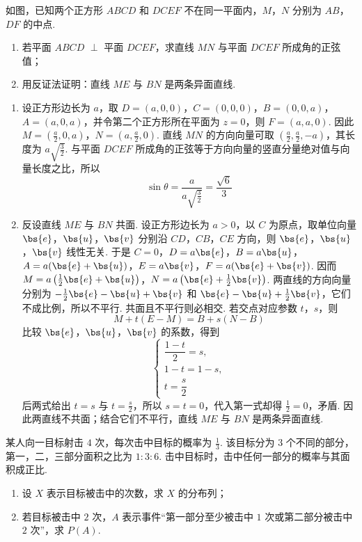 \begin{problem}
如图，已知两个正方形 \(ABCD\) 和 \(DCEF\) 不在同一平面内，\(M\)，\(N\) 分别为 \(AB\)，\(DF\) 的中点.
\begin{enumerate}
\item 若平面 \(ABCD\) \(\perp\) 平面 \(DCEF\)，求直线 \(MN\) 与平面 \(DCEF\) 所成角的正弦值；
\item 用反证法证明：直线 \(ME\) 与 \(BN\) 是两条异面直线.
\end{enumerate}

\end{problem}

\begin{solution}
\begin{enumerate}
\item 设正方形边长为 \(a\)，取 \(D=(a,0,0)\)，\(C=(0,0,0)\)，\(B=(0,0,a)\)，\(A=(a,0,a)\)，并令第二个正方形所在平面为 \(z=0\)，则 \(F=(a,a,0)\). 因此 \(M=\left(\frac a2,0,a\right)\)，\(N=\left(a,\frac a2,0\right)\).
直线 \(MN\) 的方向向量可取 \(\left(\frac a2,\frac a2,-a\right)\)，其长度为 \(a\sqrt{\frac32}\). 与平面 \(DCEF\) 所成角的正弦等于方向向量的竖直分量绝对值与向量长度之比，所以
\[
\sin\theta=\frac{a}{a\sqrt{\frac{3}{2}}}=\frac{\sqrt6}{3}
\]
\item 反设直线 \(ME\) 与 \(BN\) 共面. 设正方形边长为 \(a>0\)，以 \(C\) 为原点，取单位向量 \(\bs{e}\)，\(\bs{u}\)，\(\bs{v}\) 分别沿 \(CD\)，\(CB\)，\(CE\) 方向，则 \(\bs{e}\)，\(\bs{u}\)，\(\bs{v}\) 线性无关. 于是
\(C=0\)，\(D=a\bs{e}\)，\(B=a\bs{u}\)，\(A=a(\bs{e}+\bs{u})\)，\(E=a\bs{v}\)，\(F=a(\bs{e}+\bs{v})\). 因而 \(M=a\left(\frac12\bs{e}+\bs{u}\right)\)，\(N=a\left(\bs{e}+\frac12\bs{v}\right)\).
两直线的方向向量分别为 \(-\frac12\bs{e}-\bs{u}+\bs{v}\) 和 \(\bs{e}-\bs{u}+\frac12\bs{v}\)，它们不成比例，所以不平行. 共面且不平行则必相交. 若交点对应参数 \(t\)，\(s\)，则
\[
M+t(E-M)=B+s(N-B)
\]
比较 \(\bs{e}\)，\(\bs{u}\)，\(\bs{v}\) 的系数，得到
\[
\begin{cases}
\dfrac{1-t}{2}=s,\\
1-t=1-s,\\
t=\dfrac{s}{2}
\end{cases}
\]
后两式给出 \(t=s\) 与 \(t=\frac{s}{2}\)，所以 \(s=t=0\)，代入第一式却得 \(\frac{1}{2}=0\)，矛盾. 因此两直线不共面；结合它们不平行，直线 \(ME\) 与 \(BN\) 是两条异面直线.
\end{enumerate}
\end{solution}

\begin{problem}
某人向一目标射击 \(4\) 次，每次击中目标的概率为 \(\frac{1}{3}\). 该目标分为 \(3\) 个不同的部分，第一，二，三部分面积之比为 \(1:3:6\). 击中目标时，击中任何一部分的概率与其面积成正比.
\begin{enumerate}
\item 设 \(X\) 表示目标被击中的次数，求 \(X\) 的分布列；
\item 若目标被击中 \(2\) 次，\(A\) 表示事件“第一部分至少被击中 \(1\) 次或第二部分被击中 \(2\) 次”，求 \(P(A)\).
\end{enumerate}
\end{problem}

